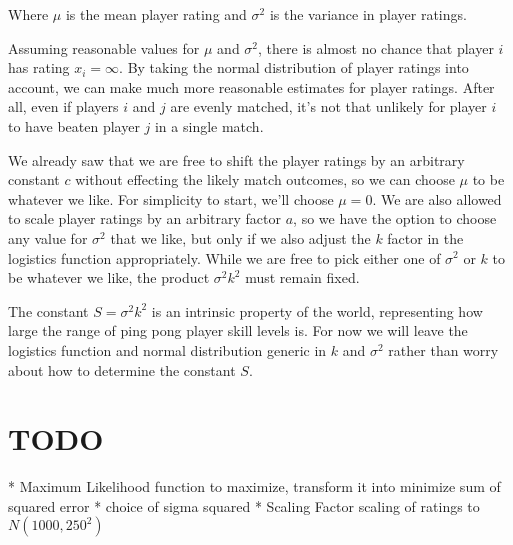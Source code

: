 \documentclass{article}
\begin{document}
Where $\mu$ is the mean player rating and $\sigma^2$ is the variance in player
ratings.

Assuming reasonable values for $\mu$ and $\sigma^2$, there is almost no chance
that player $i$ has rating $x_i = \infty$. By taking the normal distribution
of player ratings into account, we can make much more reasonable estimates for
player ratings. After all, even if players $i$ and $j$ are evenly matched,
it's not that unlikely for player $i$ to have beaten player $j$ in a single
match.

We already saw that we are free to shift the player ratings by an
arbitrary constant $c$ without effecting the likely match outcomes, so we can
choose $\mu$ to be whatever we like. For simplicity to start, we'll choose
$\mu = 0$. We are also allowed to scale player ratings by an arbitrary factor
$a$, so we have the option to choose any value for $\sigma^2$ that we like,
but only if we also adjust the $k$ factor in the logistics function
appropriately. While we are free to pick either one of $\sigma^2$ or $k$ to be
whatever we like, the product $\sigma^2 k^2$ must remain fixed.

The constant $S = \sigma^2 k^2$ is an intrinsic property of the world,
representing how large the range of ping pong player skill levels is. For now
we will leave the logistics function and normal distribution generic in $k$
and $\sigma^2$ rather than worry about how to determine the constant $S$.

\section{TODO}
* Maximum Likelihood function to maximize, transform it into minimize sum of squared error
* choice of sigma squared
* Scaling Factor scaling of ratings to $N(1000, 250^2)$
\end{document}

